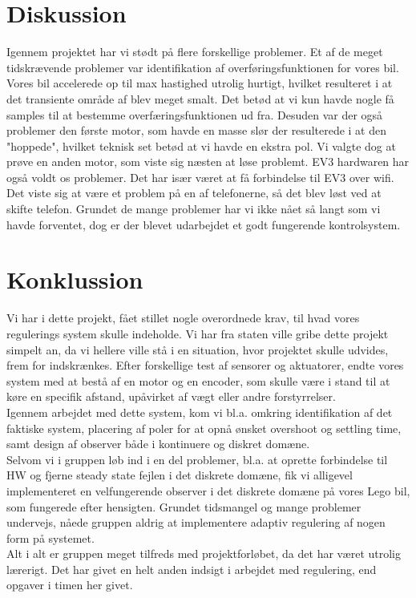 \graphicspath{{Chapters/Konklussion/}}

\section{Diskussion}
Igennem projektet har vi stødt på flere forskellige problemer. Et af de meget tidskrævende problemer var identifikation af overføringsfunktionen for vores bil. Vores bil accelerede op til max hastighed utrolig hurtigt, hvilket resulteret i at det transiente område af  blev meget smalt. Det betød at vi kun havde nogle få samples til at bestemme overfæringsfunktionen ud fra. Desuden var der også problemer den første motor, som havde en masse slør der resulterede i at den "hoppede", hvilket teknisk set betød at vi havde en ekstra pol. Vi valgte dog at prøve en anden motor, som viste sig næsten at løse problemt. 
EV3 hardwaren har også voldt os problemer. Det har især været at få forbindelse til EV3 over wifi. Det viste sig at være et problem på en af telefonerne, så det blev løst ved at skifte telefon.
Grundet de mange problemer har vi ikke nået så langt som vi havde forventet, dog er der blevet udarbejdet et godt fungerende kontrolsystem.

\section{Konklussion}

Vi har i dette projekt, fået stillet nogle overordnede krav, til hvad vores regulerings system skulle indeholde. Vi har fra staten ville gribe dette projekt simpelt an, da vi hellere ville stå i en situation, hvor projektet skulle udvides, frem for indskrænkes. Efter forskellige test af sensorer og aktuatorer, endte vores system med at bestå af en motor og en encoder, som skulle være i stand til at køre en specifik afstand, upåvirket af vægt eller andre forstyrrelser.\\
Igennem arbejdet med dette system, kom vi bl.a. omkring identifikation af det faktiske system, placering af poler for at opnå ønsket overshoot og settling time, samt design af observer både i kontinuere og diskret domæne. \\
Selvom vi i gruppen løb ind i en del problemer, bl.a. at oprette forbindelse til HW og fjerne steady state fejlen i det diskrete domæne, fik vi alligevel implementeret en velfungerende observer i det diskrete domæne på vores Lego bil, som fungerede efter hensigten. Grundet tidsmangel og mange problemer undervejs, nåede gruppen aldrig at implementere adaptiv regulering af nogen form på systemet. \\
Alt i alt er gruppen meget tilfreds med projektforløbet, da det har været utrolig lærerigt. Det har givet en helt anden indsigt i arbejdet med regulering, end opgaver i timen her givet. 




